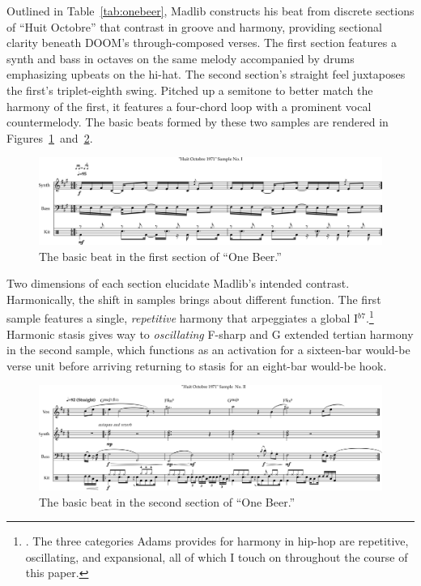 \normalsize Outlined in Table~\ref{tab:onebeer}, Madlib constructs his beat from discrete sections of ``Huit Octobre'' that contrast in groove and harmony, providing sectional clarity beneath DOOM's through-composed verses. The first section features a synth and bass in octaves on the same melody accompanied by drums emphasizing upbeats on the hi-hat. The second section's straight feel juxtaposes the first's triplet-eighth swing. Pitched up a semitone to better match the harmony of the first, it features a four-chord loop with a prominent vocal countermelody. The basic beats formed by these two samples are rendered in Figures~\ref{fig:1.2}~and~\ref{fig:1.3}.

    \begin{figure}[ht]
        \centering
        \includegraphics[width=\textwidth]{images/figures/chp 02/Figure-02.1-One-Beer-BB-I.pdf}
        \caption{The basic beat in the first section of ``One Beer.''}
        \label{fig:1.2}
    \end{figure}

Two dimensions of each section elucidate Madlib's intended contrast. Harmonically, the shift in samples brings about different function. The first sample features a single, \emph{repetitive} harmony that arpeggiates a global I$^{b7}$.\footnote{\cite{kyleadamsHarmonicSyntacticMotivic2020}. The three categories Adams provides for harmony in hip-hop are repetitive, oscillating, and expansional, all of which I touch on throughout the course of this paper.} Harmonic stasis gives way to \emph{oscillating} F-sharp and G extended tertian harmony in the second sample, which functions as an activation for a sixteen-bar would-be verse unit before arriving returning to stasis for an eight-bar would-be hook.

    \begin{figure}[ht]
        \centering
        \includegraphics[width=\textwidth]{images/figures/chp 02/Figure-02.2-One-Beer-BB-II.pdf}
        \caption{The basic beat in the second section of ``One Beer.''}
        \label{fig:1.3}
    \end{figure}

